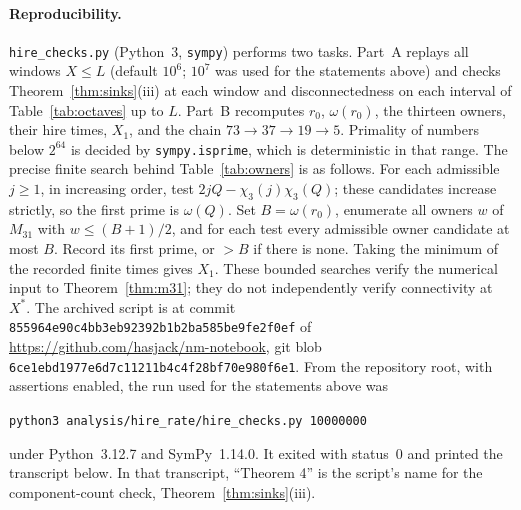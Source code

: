 \documentclass[11pt,a4paper]{article}
\theoremstyle{remark}
\newcommand{\chit}{\chi_3}
\begin{document}
\paragraph{Reproducibility.}
\texttt{hire\_checks.py} (Python~3, \texttt{sympy}) performs two tasks.
Part~A replays all windows \(X\le L\) (default \(10^6\); \(10^7\) was used for the statements above) and checks Theorem~\ref{thm:sinks}(iii) at each window and disconnectedness on each interval of Table~\ref{tab:octaves} up to \(L\).
Part~B recomputes \(r_0\), \(\omega(r_0)\), the thirteen owners, their hire times, \(X_1\), and the chain \(73\to37\to19\to5\).
Primality of numbers below \(2^{64}\) is decided by \texttt{sympy.isprime}, which is deterministic in that range.
The precise finite search behind Table~\ref{tab:owners} is as follows. For each admissible \(j\ge1\), in increasing order, test \(2jQ-\chit(j)\chit(Q)\); these candidates increase strictly, so the first prime is \(\omega(Q)\).
Set \(B=\omega(r_0)\), enumerate all owners \(w\) of \(M_{31}\) with \(w\le(B+1)/2\), and for each test every admissible owner candidate at most \(B\).
Record its first prime, or \(>B\) if there is none. Taking the minimum of the recorded finite times gives \(X_1\).
These bounded searches verify the numerical input to Theorem~\ref{thm:m31}; they do not independently verify connectivity at \(X^*\).
The archived script is  at commit \texttt{855964e90c4bb3eb92392b1b2ba585be9fe2f0ef} of \url{https://github.com/hasjack/nm-notebook}, git blob \texttt{6ce1ebd1977e6d7c11211b4c4f28bf70e980f6e1}.
From the repository root, with assertions enabled, the run used for the statements above was
\begin{center}
\texttt{python3 analysis/hire\_rate/hire\_checks.py 10000000}
\end{center}
under Python~3.12.7 and SymPy~1.14.0.
It exited with status~0 and printed the transcript below.
In that transcript, ``Theorem 4'' is the script's name for the component-count check, Theorem~\ref{thm:sinks}(iii).
\end{document}
